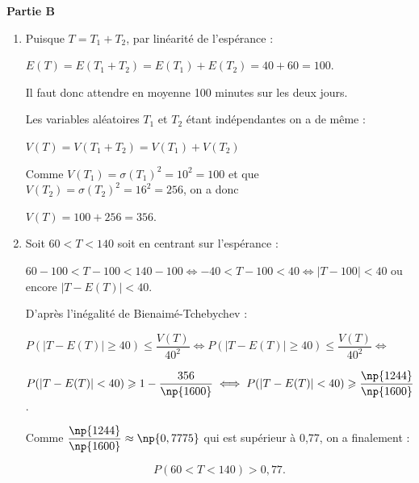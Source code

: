 \medskip

\textbf{Partie B}

\begin{enumerate}
\item Puisque $T = T_1 + T_2$, par linéarité de l'espérance :

$E(T) = E(T_1 + T_2) = E(T_1) + E(T_2) = 40 + 60 = 100$.

Il faut donc attendre en moyenne 100 minutes sur les deux jours.

Les variables aléatoires $T_1$ et $T_2$ étant indépendantes on a de même :

$V(T) = V(T_1 + T_2) = V(T_1) + V(T_2)$

Comme $V(T_1) = \sigma(T_1)^2 = 10^2 = 100$ et que $V(T_2) = \sigma(T_2)^2 = 16^2 = 256$, on a donc 

$V(T) = 100 + 256 = 356$.
\item Soit $60 < T < 140$ soit en centrant sur l'espérance :

$60 - 100 < T - 100 < 140 - 100 \iff - 40 < T - 100 < 40 \iff |T - 100| < 40$ ou encore $|T - E(T)| < 40$.

D'après l'inégalité de Bienaimé-Tchebychev : 

$P(|T - E(T)| \geqslant 40) \leqslant \dfrac{V(T)}{40^2} \iff P(|T - E(T)| \geqslant 40) \leqslant \dfrac{V(T)}{40^2} \iff $

$P(|T - E(T)| < 40) \geqslant 1 - \dfrac{356}{\np{1600}} \iff P(|T - E(T)|  < 40) \geqslant \dfrac{\np{1244}}{\np{1600}}$.

Comme $\dfrac{\np{1244}}{\np{1600}} \approx \np{0,7775}$ qui est supérieur à 0,77, on a finalement :

\[P(60 < T < 140) > 0,77.\]

\end{enumerate}

\medskip
